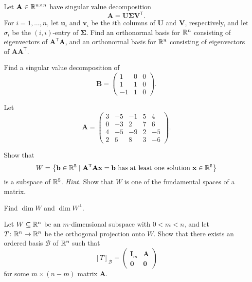 \documentclass[11pt,oneside]{article}
\begin{document}
\begin{problem}
\begin{problemsubparts}
\item Let $\mathbf A\in\mathbb{R}^{n\times n}$ have singular value decomposition
\[
\mathbf A=\mathbf U\boldsymbol\Sigma\mathbf V^{\mathsf T}.
\]
For $i=1,\dots,n$, let $\mathbf u_i$ and $\mathbf v_i$ be the $i$th columns of $\mathbf U$ and $\mathbf V$, respectively, and let $\sigma_i$ be the $(i,i)$-entry of $\boldsymbol\Sigma$. Find an orthonormal basis for $\mathbb{R}^n$ consisting of eigenvectors of $\mathbf A^{\mathsf T}\mathbf A$, and an orthonormal basis for $\mathbb{R}^n$ consisting of eigenvectors of $\mathbf A\mathbf A^{\mathsf T}$.
\item Find a singular value decomposition of
\[
\mathbf B=
\begin{pmatrix}
1&0&0\\
1&1&0\\
-1&1&0
\end{pmatrix}.
\]
\end{problemsubparts}
\end{problem}

\begin{problem}
Let
\[
\mathbf A=
\begin{pmatrix}
3&-5&-1&5&4\\
0&-3&2&7&6\\
4&-5&-9&2&-5\\
2&6&8&3&-6
\end{pmatrix}.
\]
\begin{problemsubparts}
\item Show that
\[
W=\left\{\mathbf b\in\mathbb{R}^5\mid \mathbf A^{\mathsf T}\mathbf A\mathbf x=\mathbf b
\text{ has at least one solution }\mathbf x\in\mathbb{R}^5\right\}
\]
is a subspace of $\mathbb{R}^5$. \textit{Hint.} Show that $W$ is one of the fundamental spaces of a matrix.
\item Find $\dim W$ and $\dim W^\perp$.
\end{problemsubparts}
\end{problem}

\begin{problem}
Let $W\subseteq\mathbb{R}^n$ be an $m$-dimensional subspace with $0<m<n$, and let $T\colon\mathbb{R}^n\to\mathbb{R}^n$ be the orthogonal projection onto $W$. Show that there exists an ordered basis $\mathcal B$ of $\mathbb{R}^n$ such that
\[
[T]_{\mathcal B}=
\begin{pmatrix}
\mathbf I_m&\mathbf A\\
\mathbf0&\mathbf0
\end{pmatrix}
\]
for some $m\times(n-m)$ matrix $\mathbf A$.
\end{problem}
\end{document}
